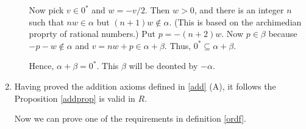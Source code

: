 \begin{enumerate}[{\bf Step 1.}]
\begin{enumerate}[(\text{A}1)]
    Now pick $v \in 0^*$ and $w = -v/2$. Then $w > 0$, and there is an integer $n$ such that $nw \in \alpha$
    but $(n+1)w \notin \alpha$. (This is based on the archimedian proprty of rational numbers.)
    Put $p = -(n+2)w$. Now $p \in \beta$ because $- p - w \notin \alpha$ and $v = nw + p \in \alpha + \beta$.
    Thus, $0^* \subseteq \alpha + \beta$. 

    Hence, $\alpha + \beta = 0^*$. This $\beta$ will be deonted by $-\alpha$.

\end{enumerate}

\item Having proved the addition axioms defined in \ref{add} (A),
it follows the Proposition \ref{addprop} is valid in $R$.

Now we can prove one of the requirements in definition \ref{ordf}.

\end{enumerate}